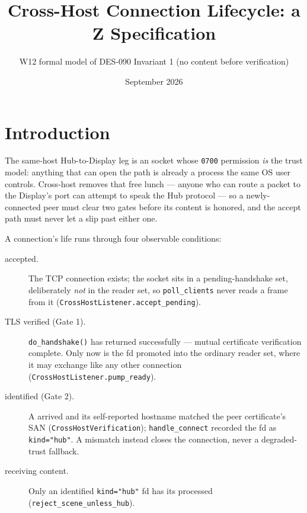 \documentclass[a4paper,10pt,fleqn]{article}
\begin{document}
\title{Cross-Host Connection Lifecycle: a Z Specification}
\author{W12 formal model of DES-090 Invariant 1 (no content before
verification)}
\date{September 2026}
\maketitle

\section{Introduction}

The same-host Hub-to-Display leg is an  socket whose
\texttt{0700} permission \emph{is} the trust model: anything that can open
the path is already a process the same OS user controls.  Cross-host
removes that free lunch --- anyone who can route a packet to the
Display's port can attempt to speak the Hub protocol --- so a
newly-connected peer must clear two gates before its content is honored,
and the accept path must never let a  slip past either
one.

A connection's life runs through four observable conditions:

\begin{description}
  \item[accepted.] The TCP connection exists; the socket sits in a
    pending-handshake set, deliberately \emph{not} in the reader set, so
    \texttt{poll\_clients} never reads a frame from it
    (\texttt{CrossHostListener.accept\_pending}).
  \item[TLS verified (Gate 1).] \texttt{do\_handshake()} has returned
    successfully --- mutual certificate verification complete.  Only now
    is the fd promoted into the ordinary reader set, where it may exchange
     like any other connection
    (\texttt{CrossHostListener.pump\_ready}).
  \item[identified (Gate 2).] A  arrived and its
    self-reported  hostname matched the peer certificate's
    SAN (\texttt{CrossHostVerification}); \texttt{handle\_connect}
    recorded the fd as \texttt{kind="hub"}.  A mismatch instead closes the
    connection, never a degraded-trust fallback.
  \item[receiving content.] Only an identified \texttt{kind="hub"} fd has
    its  processed (\texttt{reject\_scene\_unless\_hub}).
\end{description}
\end{document}
